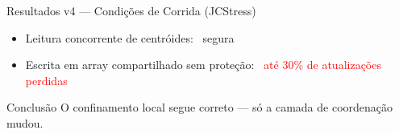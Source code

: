 \begin{frame}{Resultados v4 --- Condições de Corrida (JCStress)}
    \begin{itemize}
        \item Leitura concorrente de centróides: \textcolor{green!60!black}{\cmark\ segura}
        \item Escrita em array compartilhado sem proteção: \textcolor{red}{\xmark\ até 30\% de atualizações perdidas}
    \end{itemize}

    \vspace{1em}
    \begin{block}{Conclusão}
        O confinamento local segue correto --- só a camada de coordenação mudou.
    \end{block}
\end{frame}
